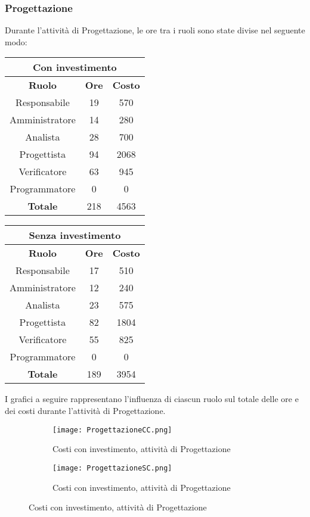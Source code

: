 \documentclass{scalatekids-article}
\begin{document}
\subsubsection{Progettazione}
Durante l'attività di Progettazione, le ore tra i ruoli sono state divise nel seguente modo:
\begin{center}
  \normalsize
  \begin{tabular}{| c | c | c |}
    \hline
    \multicolumn{3}{|c|}{\textbf{Con investimento}}\\
    \hline
    \textbf{Ruolo} & \textbf{Ore} & \textbf{Costo}\\
    \hline
    Responsabile & 19 & 570\\
    Amministratore & 14 & 280\\
    Analista & 28 & 700\\
    Progettista & 94 & 2068\\
    Verificatore & 63 & 945 \\
    Programmatore & 0 & 0 \\
    \hline
    \textbf{Totale} & 218 & 4563\\
    \hline
  \end{tabular}
  \qquad
  \begin{tabular}{| c | c | c |}
    \hline
    \multicolumn{3}{|c|}{\textbf{Senza investimento}}\\
    \hline
    \textbf{Ruolo} & \textbf{Ore} & \textbf{Costo}\\
    \hline
    Responsabile & 17 & 510\\
    Amministratore & 12 & 240\\
    Analista & 23 & 575\\
    Progettista & 82 & 1804\\
    Verificatore & 55 & 825 \\
    Programmatore & 0 & 0 \\
    \hline
    \textbf{Totale} & 189 & 3954\\
    \hline
  \end{tabular}
\end{center}
I grafici a seguire rappresentano l'influenza di ciascun ruolo sul totale delle ore e dei costi durante l'attività di Progettazione.
\begin{figure}[H]
  \begin{subfigure}[H]{0.47\textwidth}
    \texttt{[image: ProgettazioneCC.png]}
    \caption{Costi con investimento, attività di Progettazione}
  \end{subfigure}
  \qquad
  \begin{subfigure}[H]{0.47\textwidth}
    \texttt{[image: ProgettazioneSC.png]}
    \caption{Costi con investimento, attività di Progettazione}
  \end{subfigure}
\end{figure}
\newpage
\end{document}

